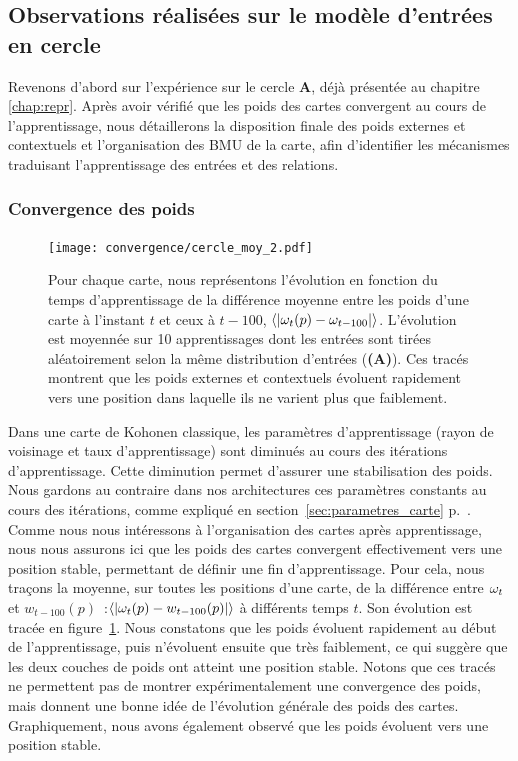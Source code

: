 \documentclass[../main]{subfiles}
\begin{document}
\subsection{Observations réalisées sur le modèle d'entrées en cercle}

Revenons d'abord sur l'expérience sur le cercle \textbf{A}, déjà présentée au chapitre \ref{chap:repr}. 
Après avoir vérifié que les poids des cartes convergent au cours de l'apprentissage, nous détaillerons la disposition finale des poids externes et contextuels et l'organisation des BMU de la carte, afin d'identifier les mécanismes traduisant l'apprentissage des entrées et des relations.

\subsubsection{Convergence des poids}

\begin{figure}[ht]
	\texttt{[image: convergence/cercle\_moy\_2.pdf]}
	\vspace{-0.5cm}
	\caption{Pour chaque carte, nous représentons l'évolution en fonction du temps d'apprentissage de la différence moyenne entre les poids d'une carte à l'instant $t$ et ceux à $t-100$, $\langle|\omega_t(p) - \omega_{t-100}|\rangle$.
	L'évolution est moyennée sur 10 apprentissages dont les entrées sont tirées aléatoirement selon la même distribution d'entrées (\textbf{(A)}).
	Ces tracés montrent que les poids externes et contextuels évoluent rapidement vers une position dans laquelle ils ne varient plus que faiblement.\label{fig:conv}}
\end{figure}
Dans une carte de Kohonen classique, les paramètres d'apprentissage (rayon de voisinage et taux d'apprentissage) sont diminués au cours des itérations d'apprentissage. Cette diminution permet d'assurer une stabilisation des poids. Nous gardons au contraire dans nos architectures ces paramètres constants au cours des itérations, comme expliqué en section~\ref{sec:parametres_carte} p.~\pageref{sec:parametres_carte}.
Comme nous nous intéressons à l'organisation des cartes après apprentissage, nous nous assurons ici que les poids des cartes convergent effectivement vers une position stable, permettant de définir une fin d'apprentissage.
Pour cela, nous traçons la moyenne, sur toutes les positions d'une carte, de la différence entre $\omega_t$ et $w_{t-100}(p)$~:$\langle | \omega_t(p) - w_{t-100}(p)| \rangle $ à différents temps $t$. Son évolution est tracée en figure~\ref{fig:conv}. Nous constatons que les poids évoluent rapidement au début de l'apprentissage, puis n'évoluent ensuite que très faiblement, ce qui suggère que les deux couches de poids ont atteint une position stable. Notons que ces tracés ne permettent pas de montrer expérimentalement une convergence des poids, mais donnent une bonne idée de l'évolution générale des poids des cartes.
Graphiquement, nous avons également observé que les poids évoluent vers une position stable.
\end{document}

